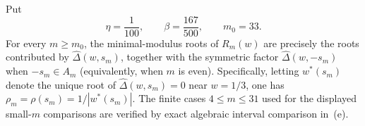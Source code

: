 \begin{lemma}
  \label{lem:root-separation}
  Put
  \[
    \eta=\frac1{100},\qquad \beta=\frac{167}{500},\qquad m_0=33.
  \]
  For every \(m\ge m_0\), the minimal-modulus roots of
  \(R_m(w)\) are precisely the roots contributed by
  \(\widehat\Delta(w,s_m)\), together with the symmetric factor
  \(\widehat\Delta(w,-s_m)\) when \(-s_m\in A_m\) (equivalently, when
  \(m\) is even). Specifically, letting \(w^*(s_m)\) denote the unique
  root of \(\widehat\Delta(w,s_m)=0\) near \(w=1/3\), one has
  \(\rho_m=\rho(s_m)=1/|w^*(s_m)|\). The finite cases
  \(4\le m\le31\) used for the displayed small-\(m\) comparisons are
  verified by exact algebraic interval comparison in
  \,\textup{(e)}.
\end{lemma}

